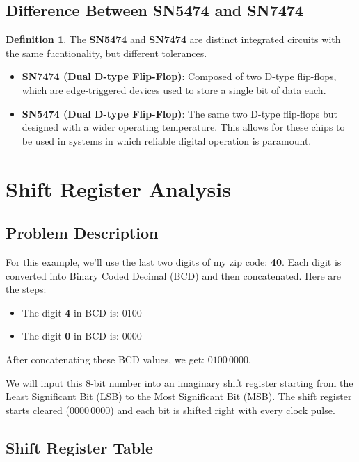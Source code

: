 \documentclass[12pt]{article}
\theoremstyle{definition}
\newtheorem{definition}{Definition}
\begin{document}
\subsection*{Difference Between SN5474 and SN7474}

\begin{definition}
	The \textbf{SN5474} and \textbf{SN7474} are distinct integrated circuits with the same fucntionality, but different tolerances.
	\begin{itemize}
		\item \textbf{SN7474 (Dual D-type Flip-Flop)}: Composed of two D-type flip-flops, which are edge-triggered devices used to store a single bit of data each.
		\item \textbf{SN5474 (Dual D-type Flip-Flop)}: The same two D-type flip-flops
		      but designed with a wider operating temperature. This allows for these
		      chips to be used in systems in which reliable digital operation is
		      paramount.
	\end{itemize}
\end{definition}
\section*{Shift Register Analysis}

\subsection*{Problem Description}
For this example, we'll use the last two digits of my zip code: \textbf{40}. Each digit is converted into Binary Coded Decimal (BCD) and then concatenated. Here are the steps:

\begin{itemize}
	\item The digit \textbf{4} in BCD is: \( 0100 \)
	\item The digit \textbf{0} in BCD is: \( 0000 \)
\end{itemize}

After concatenating these BCD values, we get: \( 0100 \, 0000 \).

We will input this 8-bit number into an imaginary shift register starting from the Least Significant Bit (LSB) to the Most Significant Bit (MSB). The shift register starts cleared (\( 0000 \, 0000 \)) and each bit is shifted right with every clock pulse.

\subsection*{Shift Register Table}
\end{document}
